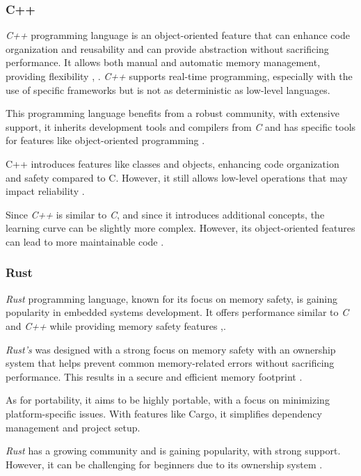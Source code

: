 \subsubsection{C++}
\textit{C++} programming language is an object-oriented feature that can enhance code organization and reusability and can provide abstraction without sacrificing performance.
It allows both manual and automatic memory management, providing flexibility \cite{LPROG2}, \cite{LPROG6}.
\textit{C++} supports real-time programming, especially with the use of specific frameworks but is not as deterministic as low-level languages.

This programming language benefits from a robust community, with extensive support, it inherits development tools and compilers from \textit{C} and has specific tools for features like object-oriented programming \cite{LPROG7}.

C++ introduces features like classes and objects, enhancing code organization and safety compared to C.
However, it still allows low-level operations that may impact reliability \cite{LPROG5}.

Since \textit{C++} is similar to \textit{C}, and since it introduces additional concepts, the learning curve can be slightly more complex.
However, its object-oriented features can lead to more maintainable code \cite{LPROG7}.

\subsubsection{Rust}
\textit{Rust} programming language, known for its focus on memory safety, is gaining popularity in embedded systems development.
It offers performance similar to \textit{C} and \textit{C++} while providing memory safety features \cite{LPROG2},\cite{LPROG7}.

\textit{Rust's} was designed with a strong focus on memory safety with an ownership system that helps prevent common memory-related errors without sacrificing performance.
This results in a secure and efficient memory footprint \cite{LPROG2}.

As for portability, it aims to be highly portable, with a focus on minimizing platform-specific issues.
With features like Cargo, it simplifies dependency management and project setup.

\textit{Rust} has a growing community and is gaining popularity, with strong support.
However, it can be challenging for beginners due to its ownership system \cite{LPROG7}.

